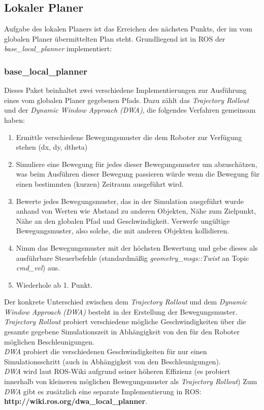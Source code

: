 \documentclass[oribibl]{llncs}
\begin{document}
\subsection{Lokaler Planer} \label{localPlanner}
Aufgabe des lokalen Planers ist das Erreichen des nächsten Punkts, der im vom globalen Planer übermittelten Plan steht. Grundliegend ist in ROS der \textit{base\_local\_planner} implementiert: \subsubsection{base\_local\_planner}
Dieses Paket beinhaltet zwei verschiedene Implementierungen zur Ausführung eines vom globalen Planer gegebenen Pfads. Dazu zählt das \textit{Trajectory Rollout} und der \textit{Dynamic Window Approach (DWA)}, die folgendes Verfahren gemeinsam haben:
\begin{enumerate}	
\item Ermittle verschiedene Bewegungsmuster die dem Roboter zur Verfügung stehen (dx, dy, dtheta)
\item Simuliere eine Bewegung für jedes dieser Bewegungsmuster um abzuschätzen, was beim Ausführen dieser Bewegung passieren würde wenn die Bewegung für einen bestimmten (kurzen) Zeitraum ausgeführt wird.
\item Bewerte jedes Bewegungsmuster, das in der Simulation ausgeführt wurde anhand von Werten wie Abstand zu anderen Objekten, Nähe zum Zielpunkt, Nähe an den globalen Pfad und Geschwindigkeit. Verwerfe ungültige Bewegungsmuster, also solche, die mit anderen Objekten kollidieren.
\item Nimm das Bewegungsmuster mit der höchsten Bewertung und gebe dieses als ausführbare Steuerbefehle (standardmäßig \textit{geometry\_msgs::Twist} an Topic \textit{cmd\_vel}) aus.
\item Wiederhole ab 1. Punkt.
\end{enumerate}

Der konkrete Unterschied zwischen dem \textit{Trajectory Rollout} und dem \textit{Dynamic Window Approach (DWA)} besteht in der Erstellung der Bewegungsmuster.\\
\textit{Trajectory Rollout} probiert verschiedene mögliche Geschwindigkeiten über die gesamte gegebene Simulationszeit in Abhängigkeit von den für den Roboter möglichen Beschleunigungen.\\
\textit{DWA} probiert die verschiedenen Geschwindigkeiten für nur einen Simulationsschritt (auch in Abhängigkeit von den Beschleunigungen).\\
\textit{DWA} wird laut ROS-Wiki aufgrund seiner höheren Effizienz (es probiert innerhalb von kleineren möglichen Bewegungsmuster als \textit{Trajectory Rollout}) \cite{baseLocalPlanner}
Zum \textit{DWA} gibt es zusätzlich eine separate Implementierung in ROS:\\ \textbf{http://wiki.ros.org/dwa\_local\_planner}.
\end{document}

